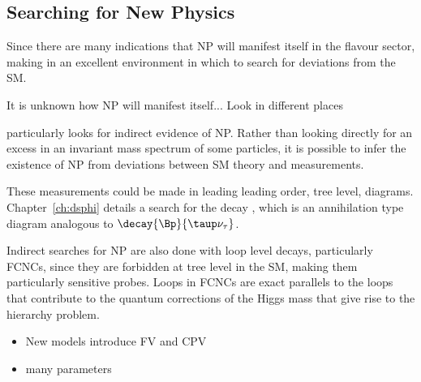 \subsection{Searching for New Physics}

Since there are many indications that NP will manifest itself in the flavour sector, making in an
excellent environment in which to search for deviations from the SM.

It is unknown how NP will manifest itself...
Look in different places

\lhcb particularly looks for indirect evidence of NP.
Rather than looking directly for an excess in an invariant mass spectrum of some particles, it is
possible to infer the existence of NP from deviations between SM theory and measurements.

These measurements could be made in leading leading order, tree level, diagrams.
Chapter~\ref{ch:dsphi} details a search for the decay \btodsphi, which is an
annihilation type diagram analogous to $\decay{\Bp}{\taup\nu_\tau}$.




Indirect searches for NP are also done with loop level decays, particularly FCNCs, since they are
forbidden at tree level in the SM, making them particularly sensitive probes.
Loops in FCNCs are exact parallels to the loops that contribute to the quantum corrections of the
Higgs mass that give rise to the hierarchy problem.





\begin{itemize}
  \item New models introduce FV and CPV
  \item many parameters
\end{itemize}

